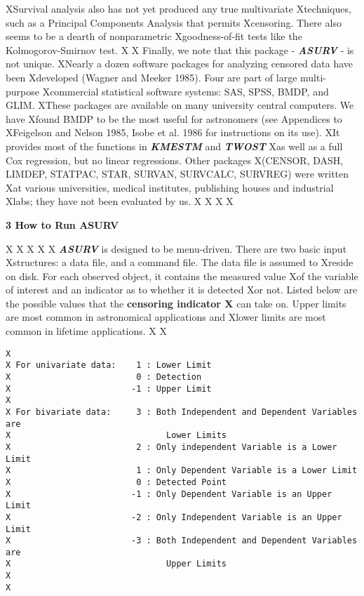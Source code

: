 XSurvival analysis also has not yet produced any true multivariate 
Xtechniques, such as a Principal Components Analysis that permits 
Xcensoring.  There also seems to be a  dearth of nonparametric 
Xgoodness-of-fit tests like the Kolmogorov-Smirnov test.
X
X    Finally, we note that this package - {\sl\bf ASURV} - is not unique. 
XNearly a dozen software packages for analyzing censored data have been 
Xdeveloped (Wagner and Meeker 1985).  Four are part of large multi-purpose 
Xcommercial statistical software systems:  SAS, SPSS, BMDP, and GLIM.  
XThese packages are available on many university central computers. We have 
Xfound BMDP to be the most useful for astronomers (see Appendices to 
XFeigelson and Nelson 1985, Isobe et al. 1986 for instructions on its use).   
XIt provides most of the functions in {\sl\bf KMESTM} and {\sl\bf TWOST} 
Xas well as a full Cox regression, but no linear regressions. Other packages 
X(CENSOR, DASH, LIMDEP, STATPAC, STAR, SURVAN, SURVCALC, SURVREG) were written 
Xat various universities, medical institutes, publishing houses and industrial 
Xlabs;  they have not been evaluated by us. 
X 
X
X\newpage
X\centerline{\Large\bf 3  How to Run ASURV}
X
X\medskip
X
X 
X     {\sl\bf ASURV} is designed to be menu-driven.  There are two basic input
Xstructures:  a data file, and a command file.  The data file is assumed to
Xreside on disk.  For each observed object, it contains the measured value 
Xof the variable of interest and an indicator as to whether it is detected
Xor not.  Listed below are the possible values that the {\bf censoring indicator
X} can take on.  Upper limits are most common in astronomical applications and
Xlower limits are most common in lifetime applications. 
X
X\begin{verbatim}
X
X For univariate data:    1 : Lower Limit
X                         0 : Detection
X                        -1 : Upper Limit
X
X For bivariate data:     3 : Both Independent and Dependent Variables are 
X                               Lower Limits
X                         2 : Only independent Variable is a Lower Limit
X                         1 : Only Dependent Variable is a Lower Limit
X                         0 : Detected Point
X                        -1 : Only Dependent Variable is an Upper Limit
X                        -2 : Only Independent Variable is an Upper Limit
X                        -3 : Both Independent and Dependent Variables are
X                               Upper Limits
X
X\end{verbatim}
